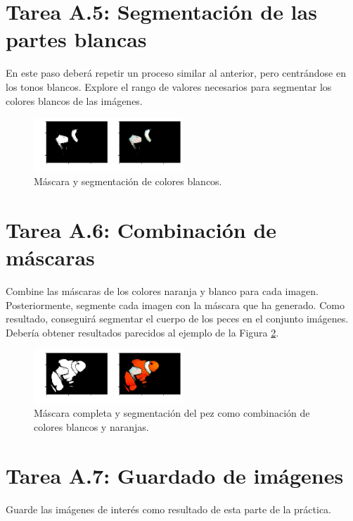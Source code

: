 \section*{Tarea A.5: Segmentación de las partes blancas}

En este paso deberá repetir un proceso similar al anterior, pero centrándose en los tonos blancos. Explore el rango de valores necesarios para segmentar los colores blancos de las imágenes.

\begin{figure}[h]
    \centering
    \includegraphics[width=0.5\textwidth]{Lab_2/template/figures/white.png}
    \caption{Máscara y segmentación de colores blancos.}
    \label{fig:whithe_mask}
\end{figure}

\section*{Tarea A.6: Combinación de máscaras}

Combine las máscaras de los colores naranja y blanco para cada imagen. Posteriormente, segmente cada imagen con la máscara que ha generado. Como resultado, conseguirá segmentar el cuerpo de los peces en el conjunto imágenes. Debería obtener resultados parecidos al ejemplo de la Figura \ref{fig:fish_output}.


\begin{figure}[h]
    \centering
    \includegraphics[width=0.5\textwidth]{Lab_2/template/figures/output.png}
    \caption{Máscara completa y segmentación del pez como combinación de colores blancos y naranjas.}
    \label{fig:fish_output}
\end{figure}


\section*{Tarea A.7: Guardado de imágenes}

Guarde las imágenes de interés como resultado de esta parte de la práctica.